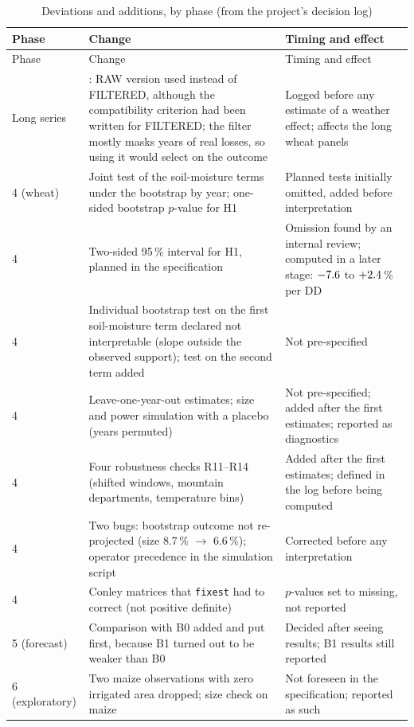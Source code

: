 {\footnotesize
\renewcommand{\arraystretch}{0.97}
\begin{longtable}{>{\raggedright}p{1.3cm}>{\raggedright}p{7.3cm}>{\raggedright\arraybackslash}p{4.6cm}}
\caption{Deviations and additions, by phase (from the project's decision log)}
\label{tab:deviations} \\
\toprule
Phase & Change & Timing and effect \\
\midrule
\endfirsthead
\toprule
Phase & Change & Timing and effect \\
\midrule
\endhead
Long series & \textcite{schauberger2022}: RAW version used instead of FILTERED, although the compatibility criterion had been written for FILTERED; the filter mostly masks years of real losses, so using it would select on the outcome & Logged before any estimate of a weather effect; affects the long wheat panels \\
4 (wheat) & Joint test of the soil-moisture terms under the bootstrap by year; one-sided bootstrap $p$-value for H1 & Planned tests initially omitted, added before interpretation \\
4 & Two-sided 95\,\% interval for H1, planned in the specification & Omission found by an internal review; computed in a later stage: $-7.6$ to $+2.4$\,\% per DD \\
4 & Individual bootstrap test on the first soil-moisture term declared not interpretable (slope outside the observed support); test on the second term added & Not pre-specified \\
4 & Leave-one-year-out estimates; size and power simulation with a placebo (years permuted) & Not pre-specified; added after the first estimates; reported as diagnostics \\
4 & Four robustness checks R11--R14 (shifted windows, mountain departments, temperature bins) & Added after the first estimates; defined in the log before being computed \\
4 & Two bugs: bootstrap outcome not re-projected (size 8.7\,\% $\to$ 6.6\,\%); operator precedence in the simulation script & Corrected before any interpretation \\
4 & Conley matrices that \texttt{fixest} had to correct (not positive definite) & $p$-values set to missing, not reported \\
5 (forecast) & Comparison with B0 added and put first, because B1 turned out to be weaker than B0 & Decided after seeing results; B1 results still reported \\
6 (explor\-atory) & Two maize observations with zero irrigated area dropped; size check on maize & Not foreseen in the specification; reported as such \\

\end{longtable}}
